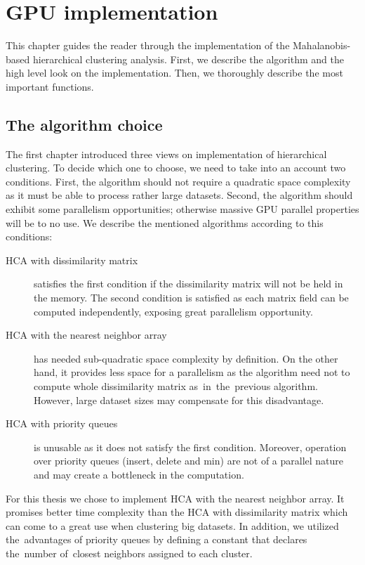 \chapter{GPU implementation}

This chapter guides the reader through the implementation of the Mahalanobis-based hierarchical clustering analysis. First, we describe the algorithm and the high level look on the implementation. Then, we thoroughly describe the most important functions.

\section{The algorithm choice}

The first chapter introduced three views on implementation of hierarchical clustering. To decide which one to choose, we need to take into an account two conditions. First, the algorithm should not require a quadratic space complexity as it must be able to process rather large datasets. Second, the algorithm should exhibit some parallelism opportunities; otherwise massive GPU parallel properties will be to no use.  We describe the mentioned algorithms according to this conditions:
\begin{description}

\item[HCA with dissimilarity matrix] satisfies the first condition if the dissimilarity matrix will not be held in the memory. The second condition is satisfied as each matrix field can be computed independently, exposing great parallelism opportunity. 

\item[HCA with the nearest neighbor array] has needed sub-quadratic space complexity by definition. On the other hand, it provides less space for a parallelism as the algorithm need not to compute whole dissimilarity matrix as~in~the~previous algorithm. However, large dataset sizes may compensate for this disadvantage. 

\item[HCA with priority queues] is unusable as it does not satisfy the first condition. Moreover, operation over priority queues (insert, delete and min) are not of a parallel nature and may create a bottleneck in the computation.

\end{description}

For this thesis we chose to implement HCA with the nearest neighbor array. It promises better time complexity than the HCA with dissimilarity matrix which can come to a great use when clustering big datasets. In addition, we utilized the~advantages of priority queues by defining a constant that declares the~number of~closest neighbors assigned to each cluster.

